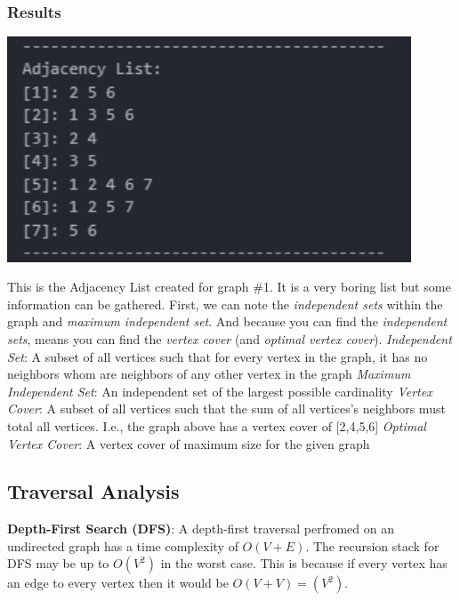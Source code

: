 \documentclass[12pt, letterpaper]{article}
\begin{document}
\subsubsection{Results}
\begin{center}
   \includegraphics[width=120mm, scale=0.5]{Images/Graph1_AdjList.png}
\end{center}
This is the Adjacency List created for graph \#1.
It is a very boring list but some information can be gathered.
First, we can note the \textit{independent sets} within the graph and \textit{maximum independent set}.
And because you can find the \textit{independent sets}, means you can find the \textit{vertex cover} (and \textit{optimal vertex cover}).
\vspace*{5px}
\newline
\textit{Independent Set}: A subset of all vertices such that for every vertex in the graph, it has no neighbors whom are neighbors of any other vertex in the graph
\vspace*{5px}
\newline
\textit{Maximum Independent Set}: An independent set of the largest possible cardinality
\vspace*{5px}
\newline
\textit{Vertex Cover}: A subset of all vertices such that the sum of all vertices's neighbors must total all vertices.
I.e., the graph above has a vertex cover of [2,4,5,6] 
\vspace*{5px}
\newline
\textit{Optimal Vertex Cover}: A vertex cover of maximum size for the given graph

\subsection{Traversal Analysis} \label{Traversals}
\textbf{Depth-First Search (DFS)}:
\newline
A depth-first traversal perfromed on an undirected graph has a time complexity of $O(V + E)$.
The recursion stack for DFS may be up to $O(V^2)$ in the worst case.
This is because if every vertex has an edge to every vertex then it would be $O(V + V) = (V^2)$.
\end{document}
